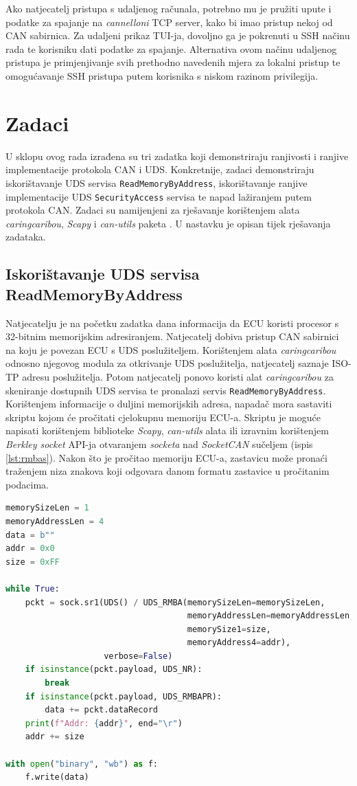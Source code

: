 \documentclass[times, utf8, diplomski, numeric]{fer}
\begin{document}
Ako natjecatelj pristupa s udaljenog računala, potrebno mu je pružiti upute i podatke za spajanje na \textit{cannelloni} TCP server, kako bi imao pristup nekoj od CAN sabirnica. Za udaljeni prikaz TUI-ja, dovoljno ga je pokrenuti u SSH načinu rada te korisniku dati podatke za spajanje. Alternativa ovom načinu udaljenog pristupa je primjenjivanje svih prethodno navedenih mjera za lokalni pristup te omogućavanje SSH pristupa putem korisnika s niskom razinom privilegija.
\section{Zadaci}
U sklopu ovog rada izrađena su tri zadatka koji demonstriraju ranjivosti i ranjive implementacije protokola CAN i UDS. Konkretnije, zadaci demonstriraju iskorištavanje UDS servisa \texttt{ReadMemoryByAddress}, iskorištavanje ranjive implementacije UDS \texttt{SecurityAccess} servisa te napad lažiranjem putem protokola CAN. Zadaci su namijenjeni za rješavanje korištenjem alata \textit{caringcaribou}, \textit{Scapy} i \textit{can-utils} paketa \cite{caringcaribou, scapy}. U nastavku je opisan tijek rješavanja zadataka.

\subsection{Iskorištavanje UDS servisa ReadMemoryByAddress}
Natjecatelju je na početku zadatka dana informacija da ECU koristi procesor s 32-bitnim memorijskim adresiranjem. Natjecatelj dobiva pristup CAN sabirnici na koju je povezan ECU s UDS poslužiteljem. Korištenjem alata \textit{caringcaribou} odnosno njegovog modula za otkrivanje UDS poslužitelja, natjecatelj saznaje ISO-TP adresu poslužitelja. Potom natjecatelj ponovo koristi alat \textit{caringcaribou} za skeniranje dostupnih UDS servisa te pronalazi servis \texttt{ReadMemoryByAddress}. Korištenjem informacije o duljini memorijskih adresa, napadač mora sastaviti skriptu kojom će pročitati cjelokupnu memoriju ECU-a. Skriptu je moguće napisati korištenjem biblioteke \textit{Scapy}, \textit{can-utils} alata ili izravnim korištenjem \textit{Berkley socket} API-ja otvaranjem \textit{socketa} nad \textit{SocketCAN} sučeljem (ispis \ref{lst:rmbas}). Nakon što je pročitao memoriju ECU-a, zastavicu može pronaći traženjem niza znakova koji odgovara danom formatu zastavice u pročitanim podacima.
\bigskip
\begin{lstlisting}[language=Python, label={lst:rmbas},caption={\textit{Scapy} skripta za čitanje cjelokupne memorije ECU-a}]
memorySizeLen = 1
memoryAddressLen = 4
data = b""
addr = 0x0
size = 0xFF

while True:
    pckt = sock.sr1(UDS() / UDS_RMBA(memorySizeLen=memorySizeLen,
                                     memoryAddressLen=memoryAddressLen,
                                     memorySize1=size,
                                     memoryAddress4=addr),
                    verbose=False)
    if isinstance(pckt.payload, UDS_NR):
        break
    if isinstance(pckt.payload, UDS_RMBAPR):
        data += pckt.dataRecord
    print(f"Addr: {addr}", end="\r")
    addr += size

with open("binary", "wb") as f:
    f.write(data)
\end{lstlisting}
\end{document}

